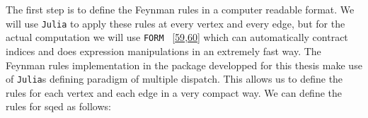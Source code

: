 \documentclass[
  10pt,
  a4paper,
  DIV=11,
  numbers=noendperiod,
  twoside]{scrreprt}
\newenvironment{Shaded}{\begin{snugshade}}{\end{snugshade}}
\newcommand{\DataTypeTok}[1]{\textcolor[rgb]{0.68,0.00,0.00}{#1}}
\newcommand{\FunctionTok}[1]{\textcolor[rgb]{0.28,0.35,0.67}{#1}}
\newcommand{\KeywordTok}[1]{\textcolor[rgb]{0.00,0.23,0.31}{#1}}
\newcommand{\NormalTok}[1]{\textcolor[rgb]{0.00,0.23,0.31}{#1}}
\newcommand{\OperatorTok}[1]{\textcolor[rgb]{0.37,0.37,0.37}{#1}}
\newcommand{\PreprocessorTok}[1]{\textcolor[rgb]{0.68,0.00,0.00}{#1}}
\newcommand{\SpecialCharTok}[1]{\textcolor[rgb]{0.37,0.37,0.37}{#1}}
\newcommand{\StringTok}[1]{\textcolor[rgb]{0.13,0.47,0.30}{#1}}
\DeclareRobustCommand{\[}{\begin{equation}}
\DeclareRobustCommand{\]}{\end{equation}}
\begin{document}
The first step is to define the Feynman rules in a computer readable
format. We will use \texttt{Julia} to apply these rules at every vertex
and every edge, but for the actual computation we will use \texttt{FORM}
~{[}\protect\hyperlink{ref-Vermaseren:2000nd}{59},\protect\hyperlink{ref-Kuipers:2012rf}{60}{]}
which can automatically contract indices and does expression
manipulations in an extremely fast way. The Feynman rules implementation
in the package developped for this thesis make use of \texttt{Julia}s
defining paradigm of multiple dispatch. This allows us to define the
rules for each vertex and each edge in a very compact way. We can define
the rules for \gls{sqed} as follows:

\begin{Shaded}
\end{Shaded}
\end{document}
